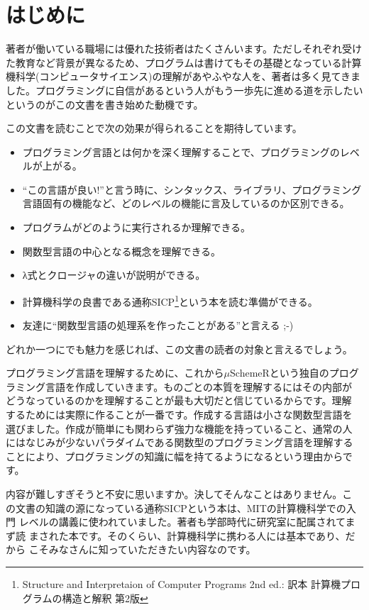

\chapter*{はじめに\hspace{-3mm}}

著者が働いている職場には優れた技術者はたくさんいます。ただしそれぞれ受けた教育など背景が異なるため、プログラムは書けてもその基礎となっている計算機科学(コンピュータサイエンス)の理解があやふやな人を、著者は多く見てきました。プログラミングに自信があるという人がもう一歩先に進める道を示したいというのがこの文書を書き始めた動機です。

この文書を読むことで次の効果が得られることを期待しています。
\begin{itemize}
\item プログラミング言語とは何かを深く理解することで、プログラミングのレベルが上がる。
\item “この言語が良い!”と言う時に、シンタックス、ライブラリ、プログラミング言語固有の機能など、どのレベルの機能に言及しているのか区別できる。
\item プログラムがどのように実行されるか理解できる。
\item 関数型言語の中心となる概念を理解できる。
\item λ式とクロージャの違いが説明ができる。
\item 計算機科学の良書である通称SICP\footnote{Structure and Interpretaion of Computer Programs 2nd ed.: 訳本 計算機プログラムの構造と解釈 第2版}という本を読む準備ができる。
\item 友達に“関数型言語の処理系を作ったことがある”と言える ;-)
\end{itemize}
どれか一つにでも魅力を感じれば、この文書の読者の対象と言えるでしょう。

プログラミング言語を理解するために、これから$\mu$SchemeRという独自のプログ
ラミング言語を作成していきます。ものごとの本質を理解するにはその内部が
どうなっているのかを理解することが最も大切だと信じているからです。理解
するためには実際に作ることが一番です。作成する言語は小さな関数型言語を
選びました。作成が簡単にも関わらず強力な機能を持っていること、通常の人
にはなじみが少ないパラダイムである関数型のプログラミング言語を理解する
ことにより、プログラミングの知識に幅を持てるようになるという理由からで
す。

内容が難しすぎそうと不安に思いますか。決してそんなことはありません。こ
の文書の知識の源になっている通称SICPという本は、MITの計算機科学での入門
レベルの講義に使われていました。著者も学部時代に研究室に配属されてまず読
まされた本です。そのくらい、計算機科学に携わる人には基本であり、だから
こそみなさんに知っていただきたい内容なのです。


